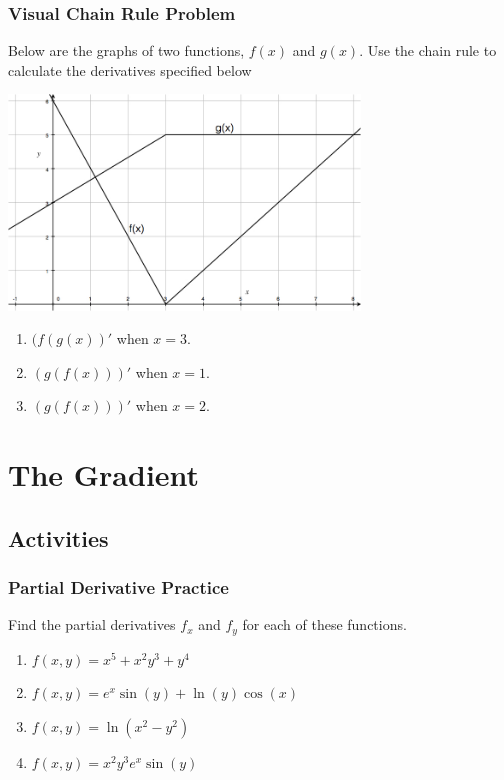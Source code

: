 \documentclass[
]{book}
\providecommand{\tightlist}{%
  \setlength{\itemsep}{0pt}\setlength{\parskip}{0pt}}
\begin{document}
\hypertarget{visual-chain-rule-problem}{%
\subsection{Visual Chain Rule Problem}\label{visual-chain-rule-problem}}

Below are the graphs of two functions, \(f(x)\) and \(g(x)\). Use the chain rule to calculate the derivatives specified below

\includegraphics[width=0.7\textwidth,height=\textheight]{images/TwoFunctions.jpg}

\begin{enumerate}
\def\labelenumi{\arabic{enumi}.}
\tightlist
\item
  \((f(g(x))'\) when \(x=3\).
\item
  \((g(f(x)))'\) when \(x=1\).
\item
  \((g(f(x)))'\) when \(x=2\).
\end{enumerate}

\hypertarget{the-gradient}{%
\chapter{The Gradient}\label{the-gradient}}

\hypertarget{activities-16}{%
\section{Activities}\label{activities-16}}

\hypertarget{partial-derivative-practice}{%
\subsection{Partial Derivative Practice}\label{partial-derivative-practice}}

Find the partial derivatives \(f_x\) and \(f_y\) for each of these functions.

\begin{enumerate}
\def\labelenumi{\arabic{enumi}.}
\tightlist
\item
  \(f(x,y) = x^5 + x^2y^3 + y^4\)
\item
  \(f(x,y) = e^x \sin(y) + \ln(y) \cos(x)\)
\item
  \(f(x,y) = \ln (x^2 - y^2)\)
\item
  \(f(x,y) = x^2 y^3 e^x \sin(y)\)
\end{enumerate}
\end{document}
